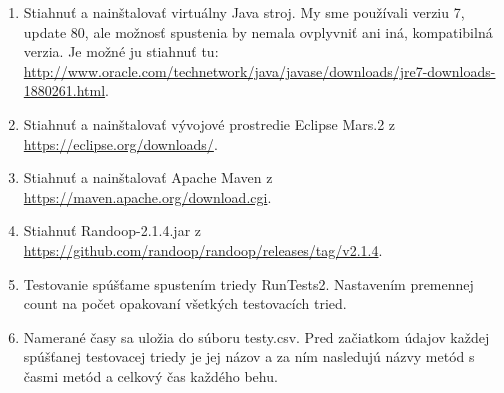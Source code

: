 \documentclass[11pt,twoside,slovak,a4paper]{article}
\begin{document}
 	\begin{enumerate}
 		\item Stiahnuť a nainštalovať virtuálny Java stroj. My sme používali verziu 7, update 80, ale možnosť spustenia by nemala ovplyvniť ani iná, kompatibilná verzia. Je možné ju stiahnuť tu: \url{http://www.oracle.com/technetwork/java/javase/downloads/jre7-downloads-1880261.html}.
 		\item Stiahnuť a nainštalovať vývojové prostredie Eclipse Mars.2 z \url{https://eclipse.org/downloads/}.
 		\item Stiahnuť a nainštalovať Apache Maven z  \url{https://maven.apache.org/download.cgi}.
 		\item Stiahnuť Randoop-2.1.4.jar z \url{https://github.com/randoop/randoop/releases/tag/v2.1.4}.
		\item Testovanie spúšťame spustením triedy RunTests2. Nastavením premennej count na počet opakovaní všetkých testovacích tried.
		\item Namerané časy sa uložia do súboru testy.csv. Pred začiatkom údajov každej spúšťanej testovacej triedy je jej názov a za ním nasledujú názvy metód s časmi metód a celkový čas každého behu.
 	\end{enumerate}
 	
 	
 	
 	
\end{document}
